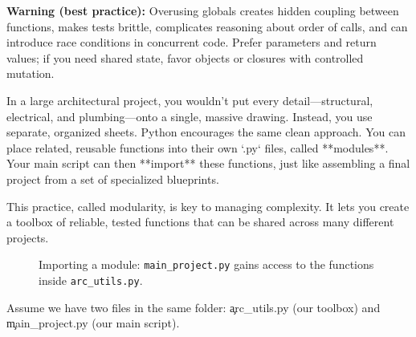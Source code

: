 \textbf{Warning (best practice):}
Overusing globals creates hidden coupling between functions, makes tests brittle, complicates reasoning about order of calls, and can introduce race conditions in concurrent code. Prefer parameters and return values; if you need shared state, favor objects or closures with controlled mutation.


In a large architectural project, you wouldn't put every detail—structural, electrical, and plumbing—onto a single, massive drawing. Instead, you use separate, organized sheets. Python encourages the same clean approach. You can place related, reusable functions into their own `.py` files, called **modules**. Your main script can then **import** these functions, just like assembling a final project from a set of specialized blueprints.

This practice, called modularity, is key to managing complexity. It lets you create a toolbox of reliable, tested functions that can be shared across many different projects.

\begin{figure}[h]
\centering
{}
\caption{Importing a module: \texttt{main\_project.py} gains access to the functions inside \texttt{arc\_utils.py}.}
\label{fig:c10_func_import}
\end{figure}

Assume we have two files in the same folder: \c{arc_utils.py} (our toolbox) and \c{main_project.py} (our main script).


